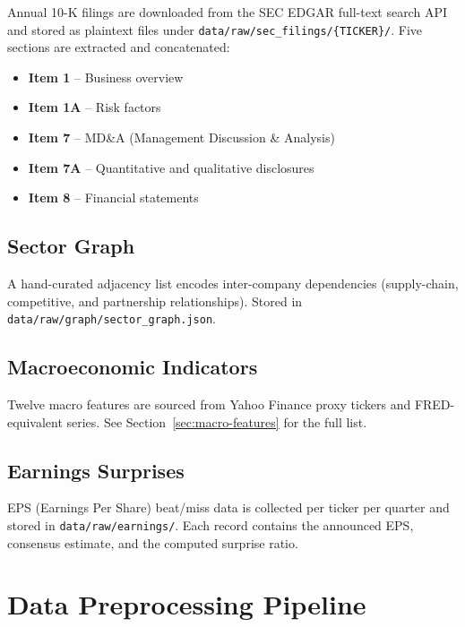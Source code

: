 \documentclass[12pt, a4paper]{article}
\begin{document}
Annual 10-K filings are downloaded from the SEC EDGAR full-text search API and stored as plaintext files under \texttt{data/raw/sec\_filings/\{TICKER\}/}.  Five sections are extracted and concatenated:

\begin{itemize}[nosep]
    \item \textbf{Item 1} -- Business overview
    \item \textbf{Item 1A} -- Risk factors
    \item \textbf{Item 7} -- MD\&A (Management Discussion \& Analysis)
    \item \textbf{Item 7A} -- Quantitative and qualitative disclosures
    \item \textbf{Item 8} -- Financial statements
\end{itemize}

\subsection{Sector Graph}

A hand-curated adjacency list encodes inter-company dependencies (supply-chain, competitive, and partnership relationships).  Stored in \texttt{data/raw/graph/sector\_graph.json}.

\subsection{Macroeconomic Indicators}

Twelve macro features are sourced from Yahoo Finance proxy tickers and FRED-equivalent series.  See Section~\ref{sec:macro-features} for the full list.

\subsection{Earnings Surprises}

EPS (Earnings Per Share) beat/miss data is collected per ticker per quarter and stored in \texttt{data/raw/earnings/}.  Each record contains the announced EPS, consensus estimate, and the computed surprise ratio.


\section{Data Preprocessing Pipeline}
\end{document}
